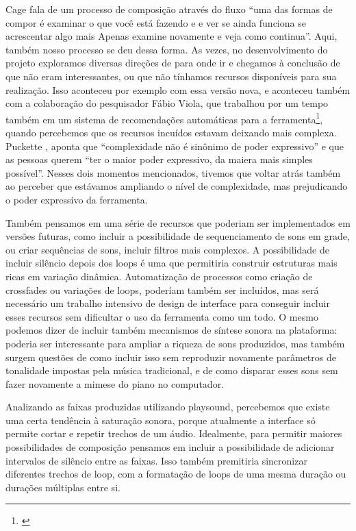 Cage fala de um processo de composição através do fluxo ``uma das formas de compor é examinar o que você está fazendo e e ver se ainda funciona se acrescentar algo mais Apenas examine novamente e veja como continua''\cite{Cage2015}. Aqui, também nosso processo se deu dessa forma. As vezes, no desenvolvimento do projeto exploramos diversas direções de para onde ir e chegamos à conclusão de que não eram interessantes, ou que não tínhamos recursos disponíveis para sua realização. Isso aconteceu por exemplo com essa versão nova, e aconteceu também com a colaboração do pesquisador Fábio Viola, que trabalhou por um tempo também em um sistema de recomendações automáticas para a ferramenta\footnote{\cite{Viola2018}}, quando percebemos que os recursos incuídos estavam deixando mais complexa. Puckette \citeyear{PucketteMiller}, aponta que ``complexidade não é sinônimo de poder expressivo'' e que as pessoas querem ``ter o maior poder expressivo, da maiera mais simples possível''. Nesses dois momentos mencionados, tivemos que voltar atrás também ao perceber que estávamos ampliando o nível de complexidade, mas prejudicando o poder expressivo da ferramenta.

Também pensamos em uma série de recursos que poderiam ser implementados em versões futuras, como incluir a possibilidade de sequenciamento de sons em grade, ou criar sequências de sons, incluir filtros mais complexos. A possibilidade de incluir silêncio depois dos loops é uma que permitiria construir estruturas mais ricas em variação dinâmica. Automatização de processos como criação de crossfades ou variações de loops, poderíam também ser incluídos, mas será necessário um trabalho intensivo de design de interface para conseguir incluir esses recursos sem dificultar o uso da ferramenta como um todo. O mesmo podemos dizer de incluir também mecanismos de síntese sonora na plataforma: poderia ser interessante para ampliar a riqueza de sons produzidos, mas também surgem questões de como incluir isso sem reproduzir novamente parâmetros de tonalidade impostas pela música tradicional, e de como disparar esses sons sem fazer novamente a mimese do piano no computador.

Analizando as faixas produzidas utilizando playsound, percebemos que existe uma certa tendência à saturação sonora, porque atualmente a interface só permite cortar e repetir trechos de um áudio. Idealmente, para permitir maiores possibilidades de composição pensamos em incluir a possibilidade de adicionar intervalos de silêncio entre as faixas. Isso também premitiria sincronizar diferentes trechos de loop, com a formatação de loops de uma mesma duração ou durações múltiplas entre si.

